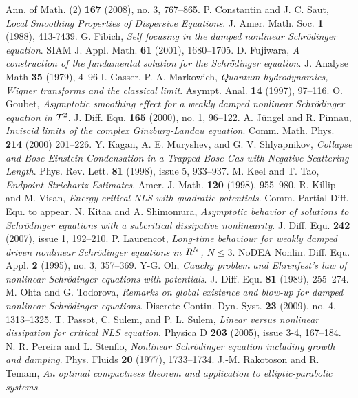 \documentclass[a4paper,leqno]{amsart}
\theoremstyle{plain}
\theoremstyle{definition}
\numberwithin{equation}{section}
\begin{document}
\begin{thebibliography}{amsplain}
Ann. of Math. (2) {\bf 167} (2008), no. 3, 767--865.
 P. Constantin and J. C. Saut, \emph{Local Smoothing Properties of Dispersive Equations}. 
J. Amer. Math. Soc. {\bf 1} (1988), 413-?439. 
 G. Fibich, \emph{Self focusing in the damped nonlinear Schr\"odinger equation}.
SIAM J. Appl. Math. {\bf 61} (2001), 1680--1705.
 D. Fujiwara, \emph{A construction of the fundamental solution for the Schr\"odinger equation}. J. Analyse Math {\bf 35} (1979), 4--96
 I. Gasser, P. A. Markowich, \emph{Quantum hydrodynamics, Wigner transforms and the classical limit}. Asympt. Anal. {\bf 14} (1997), 97--116.
 O. Goubet, \emph{Asymptotic smoothing effect for a weakly damped nonlinear Schr\"odinger equation in $T\sp 2$}.
J. Diff. Equ. {\bf 165} (2000), no. 1, 96--122.
 A. J\"ungel and R. Pinnau, \emph{Inviscid limits of the complex Ginzburg-Landau equation}. Comm. Math. Phys. {\bf 214} (2000) 201--226. 
 Y. Kagan, A. E. Muryshev, and G. V. Shlyapnikov, \emph{Collapse and Bose-Einstein Condensation in a Trapped Bose Gas with Negative Scattering Length}.
Phys. Rev. Lett. {\bf 81} (1998), issue 5, 933--937.
 M. Keel and T. Tao, \emph{Endpoint Strichartz Estimates}.
Amer. J. Math. \textbf{120} (1998), 955--980.
 R. Killip and M. Visan, \emph{Energy-critical NLS with quadratic potentials}. Comm. Partial Diff. Equ. to appear.
 N. Kitaa and A. Shimomura, \emph{Asymptotic behavior of solutions to Schr\"odinger equations with a subcritical dissipative nonlinearity}. J. Diff. Equ. {\bf 242} (2007), issue 1, 192--210.
 P. Laurencot, \emph{Long-time behaviour for weakly damped driven nonlinear Schr\"odinger equations in $R\sp N$, $N\leq 3$}.
NoDEA Nonlin. Diff. Equ. Appl. {\bf 2} (1995), no. 3, 357--369.
  Y-G. Oh, \emph{Cauchy problem and Ehrenfest's law of nonlinear Schr\"odinger equations with potentials}. J. Diff. Equ. {\bf 81} (1989), 255--274.
 M. Ohta and G. Todorova, \emph{Remarks on global existence and blow-up for damped nonlinear Schr\"odinger equations}.
Discrete Contin. Dyn. Syst. {\bf 23} (2009), no. 4, 1313--1325.
 T. Passot, C. Sulem, and P. L. Sulem, \emph{Linear versus nonlinear dissipation for critical NLS equation}.
Physica D {\bf 203} (2005), issue 3-4, 167--184.
 N. R. Pereira and L. Stenflo, \emph{Nonlinear Schr\"odinger equation including growth and damping}.
Phys. Fluids {\bf 20} (1977), 1733--1734.
 J.-M. Rakotoson and R. Temam, \emph{An optimal compactness theorem and application to elliptic-parabolic systems}. 

\end{thebibliography}
\end{document}
